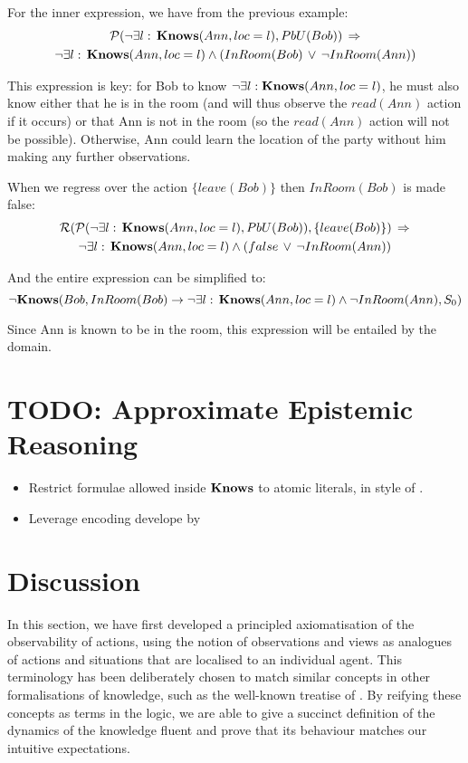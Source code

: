 For the inner expression, we have from the previous example:\begin{multline*}
\mathcal{P}(\neg\exists l:\,\mathbf{Knows}(Ann,loc=l),PbU(Bob))\,\Rightarrow\\
\neg\exists l:\,\mathbf{Knows}(Ann,loc=l)\wedge\left(InRoom(Bob)\,\vee\,\neg InRoom(Ann)\right)\end{multline*}


This expression is key: for Bob to know $\neg\exists l:\mathbf{Knows}(Ann,loc=l)$,
he must also know either that he is in the room (and will thus observe
the $read(Ann)$ action if it occurs) or that Ann is not in the room
(so the $read(Ann)$ action will not be possible). Otherwise, Ann
could learn the location of the party without him making any further
observations.

When we regress over the action $\{leave(Bob)\}$ then $InRoom(Bob)$
is made false:\begin{multline*}
\mathcal{R}(\mathcal{P}(\neg\exists l:\,\mathbf{Knows}(Ann,loc=l),PbU(Bob)),\{leave(Bob)\})\,\Rightarrow\\
\neg\exists l:\,\mathbf{Knows}(Ann,loc=l)\wedge\left(false\,\vee\,\neg InRoom(Ann)\right)\end{multline*}


And the entire expression can be simplified to:\[
\neg\mathbf{Knows}(Bob,InRoom(Bob)\rightarrow\neg\exists l:\,\mathbf{Knows}(Ann,loc=l)\wedge\neg InRoom(Ann),S_{0})\]


Since Ann is known to be in the room, this expression will be entailed
by the domain.


\section{TODO: Approximate Epistemic Reasoning}

\begin{itemize}
\item Restrict formulae allowed inside $\mathbf{Knows}$ to atomic literals, in
style of \citet{demolombe00tractable_sc_belief}. 
\item Leverage encoding develope by \citet{petrick02knowledge_equivalence} 
\end{itemize}

\section{Discussion}

In this section, we have first developed a principled axiomatisation
of the observability of actions, using the notion of observations
and views as analogues of actions and situations that are localised
to an individual agent. This terminology has been deliberately chosen
to match similar concepts in other formalisations of knowledge, such
as the well-known treatise of \citet{halpern90knowledge_distrib}.
By reifying these concepts as terms in the logic, we are able to give
a succinct definition of the dynamics of the knowledge fluent and
prove that its behaviour matches our intuitive expectations.

